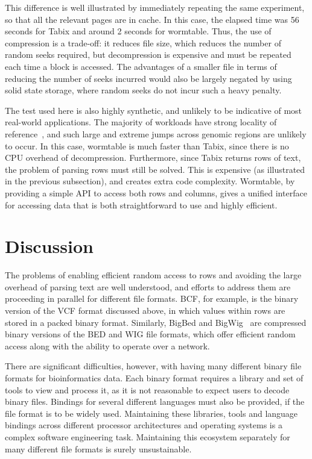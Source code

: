 \documentclass[10pt]{bmc_article}
\newenvironment{bmcformat}{\begin{raggedright}\baselineskip20pt\sloppy\setboolean{publ}{false}}{\end{raggedright}\baselineskip20pt\sloppy}
\begin{document}
\begin{bmcformat}
This difference is well illustrated by immediately repeating 
the same experiment, so that all the relevant pages are 
in cache. In this case, the elapsed time was 56 seconds for Tabix and around 
2 seconds for wormtable. Thus, the use of compression is a trade-off: 
it reduces file size, which reduces the number of random seeks 
required, but decompression is expensive and must 
be repeated each time a block is accessed.
The advantages of a smaller file in terms of reducing the
number of seeks incurred would also be largely negated 
by using solid state storage, where random seeks do not
incur such a heavy penalty.

The test used here is also highly synthetic, and unlikely to be 
indicative of most real-world applications. The majority of 
workloads have strong locality of reference~\cite{d05}, 
and such large and extreme jumps across genomic regions 
are unlikely to occur. In this case, wormtable 
is  much faster than Tabix, since there
is no CPU overhead of decompression. Furthermore, since 
Tabix returns rows of text, the problem of parsing rows
must still be solved. This is expensive (as illustrated 
in the previous subsection), and creates extra code 
complexity. Wormtable, by providing a simple API to 
access both rows and columns, gives a 
unified interface for accessing data that is 
both straightforward to use and highly efficient.


\section*{Discussion}
The problems of enabling efficient random access to rows and 
avoiding the large overhead of parsing text are well understood, 
and efforts to address them are proceeding in parallel for 
different file formats. 
BCF, for example, is the binary version of the VCF format discussed 
above, in which values within rows are stored in a packed binary 
format.  Similarly, BigBed and 
BigWig~\cite{kzbhk10} are compressed binary versions of the BED 
and WIG file formats, which offer efficient random access along 
with the ability to operate over a network. 

There are significant difficulties,
however, with having many different binary file formats for bioinformatics 
data. Each binary format requires a library and set of tools to view 
and process it, as it is not reasonable to expect users to decode binary
files. Bindings for several different languages must also be provided, if 
the file format is to be widely used.
Maintaining these libraries, tools and language bindings across 
different processor architectures and operating systems
is a complex software engineering task. Maintaining this ecosystem 
separately for many different file formats is surely 
unsustainable.


\end{bmcformat}
\end{document}
